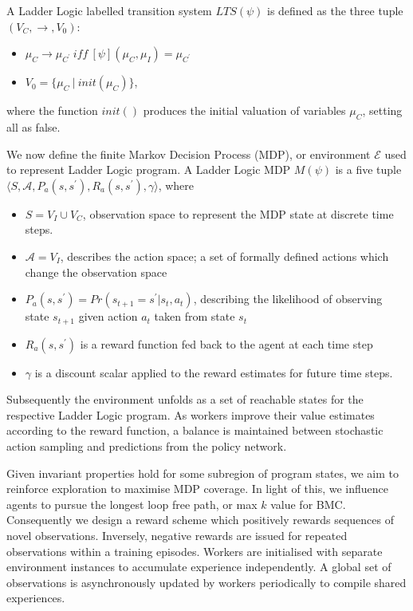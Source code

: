 \documentclass[runningheads]{llncs}
\begin{document}
A Ladder Logic labelled transition system $LTS(\psi)$ is defined as the three tuple $(V_C, \to, V_0)$:
\begin{itemize}
	\item $\mu_C \to \mu_{C^\prime} \ \textit{iff} \ [\psi](\mu_C,\mu_I)=\mu_{C^\prime}$
	\item $V_0 = \{\mu_C \ | \ init(\mu_C)\}$,
\end{itemize}where the function $init()$ produces the initial valuation of variables $\mu_C$, setting all as false.

We now define the finite Markov Decision Process (MDP), or environment $\mathcal{E}$ used to represent Ladder Logic program. A Ladder Logic MDP $M(\psi)$ is a five tuple $\langle S,\mathcal{A},P_a(s,s^\prime), R_a(s,s^\prime),\gamma \rangle$, where 
\begin{itemize}
	\item $S = V_I \cup V_C$, observation space to represent the MDP state at discrete time steps.
	\item $\mathcal{A} = V_I$, describes the action space; a set of formally defined actions which change the observation space
	\item $P_a(s,s^\prime) = Pr(s_{t+1} = s^\prime | s_t, a_t)$, describing the likelihood of observing state $s_{t+1}$ given action $a_t$ taken from state $s_t$
	\item $R_a(s,s^\prime)$ is a reward function fed back to the agent at each time step
	\item $\gamma$ is a discount scalar applied to the reward estimates for future time steps.
\end{itemize}

Subsequently the environment unfolds as a set of reachable states for the respective Ladder Logic program. As workers improve their value estimates according to the reward function, a balance is maintained between stochastic action sampling and predictions from the policy network.

Given invariant properties hold for some subregion of program states, we aim to reinforce exploration to maximise MDP coverage. In light of this, we influence agents to pursue the longest loop free path, or max $k$ value for BMC. Consequently we design a reward scheme which positively rewards sequences of novel observations. Inversely, negative rewards are issued for repeated observations within a training episodes. Workers are initialised with separate environment instances to accumulate experience independently. A global set of observations is asynchronously updated by workers periodically to compile shared experiences.    
\end{document}
